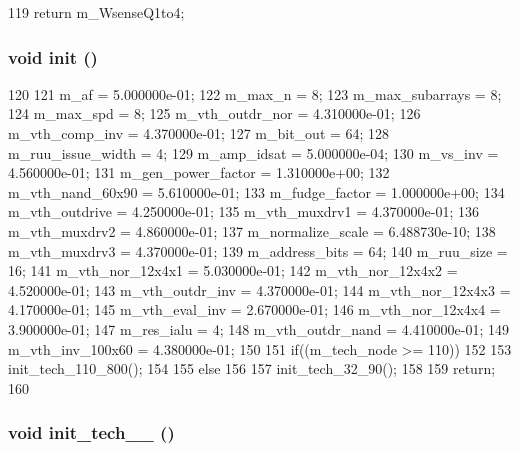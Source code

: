 \begin{DoxyCode}
119 { return m_WsenseQ1to4; }
\end{DoxyCode}
\hypertarget{classTechParameter_a02fd73d861ef2e4aabb38c0c9ff82947}{
\subsubsection[{init}]{\setlength{\rightskip}{0pt plus 5cm}void init ()}}
\label{classTechParameter_a02fd73d861ef2e4aabb38c0c9ff82947}



\begin{DoxyCode}
120 {
121     m_af = 5.000000e-01;
122     m_max_n = 8;
123     m_max_subarrays = 8;
124     m_max_spd = 8;
125     m_vth_outdr_nor = 4.310000e-01;
126     m_vth_comp_inv = 4.370000e-01;
127     m_bit_out = 64;
128     m_ruu_issue_width = 4;
129     m_amp_idsat = 5.000000e-04;
130     m_vs_inv = 4.560000e-01;
131     m_gen_power_factor = 1.310000e+00;
132     m_vth_nand_60x90 = 5.610000e-01;
133     m_fudge_factor = 1.000000e+00;
134     m_vth_outdrive = 4.250000e-01;
135     m_vth_muxdrv1 = 4.370000e-01;
136     m_vth_muxdrv2 = 4.860000e-01;
137     m_normalize_scale = 6.488730e-10;
138     m_vth_muxdrv3 = 4.370000e-01;
139     m_address_bits = 64;
140     m_ruu_size = 16;
141     m_vth_nor_12x4x1 = 5.030000e-01;
142     m_vth_nor_12x4x2 = 4.520000e-01;
143     m_vth_outdr_inv = 4.370000e-01;
144     m_vth_nor_12x4x3 = 4.170000e-01;
145     m_vth_eval_inv = 2.670000e-01;
146     m_vth_nor_12x4x4 = 3.900000e-01;
147     m_res_ialu = 4;
148     m_vth_outdr_nand = 4.410000e-01;
149     m_vth_inv_100x60 = 4.380000e-01;
150 
151     if((m_tech_node >= 110))
152     {
153         init_tech_110_800();
154     }
155     else
156     {
157         init_tech_32_90();
158     }
159     return;
160 }
\end{DoxyCode}
\hypertarget{classTechParameter_ac3246eb08ab7475baa739b641dbb3c92}{
\subsubsection[{init\_\-tech\_\-110\_\-800}]{\setlength{\rightskip}{0pt plus 5cm}void init\_\-tech\_\_ ()}}
\label{classTechParameter_ac3246eb08ab7475baa739b641dbb3c92}



